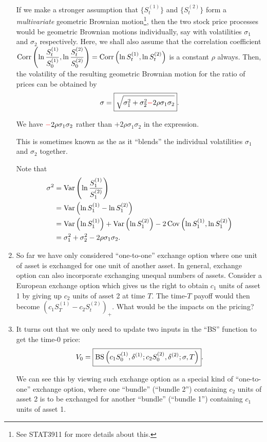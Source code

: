 \begin{enumerate}
If we make a stronger assumption that \(\{S_t^{(1)}\}\) and \(\{S_t^{(2)}\}\)
form a \emph{multivariate} geometric Brownian motion\footnote{See STAT3911 for
more details about this.}, then the two stock price processes would be
geometric Brownian motions individually, say with volatilities \(\sigma_1\) and
\(\sigma_2\) respectively. Here, we shall also assume that the correlation
coefficient \(\displaystyle \operatorname{Corr}\qty(\ln \frac{S_t^{(1)}}{S_0^{(1)}},\ln
\frac{S_t^{(2)}}{S_0^{(2)}})=\operatorname{Corr}\qty(\ln S_t^{(1)},\ln S_t^{(2)})\) is a
constant \(\rho\) always.  Then, the volatility of the resulting geometric
Brownian motion for the ratio of prices can be obtained by
\[
\sigma=\boxed{\sqrt{\sigma_1^{2}+\sigma_2^{2}{\color{red}-}2\rho\sigma_1\sigma_2}}.
\]
\begin{warning}
We have \({\color{red}-}2\rho\sigma_1\sigma_2\) rather than \(+2\rho\sigma_1\sigma_2\)
in the expression.
\end{warning}

This is sometimes known as the  as it ``blends'' the
individual volatilities \(\sigma_1\) and \(\sigma_2\) together.

\begin{pf}
Note that
\begin{align*}
\sigma^2&=\operatorname{Var}\qty(\ln\frac{S_1^{(1)}}{S_1^{(2)}}) \\
&=\operatorname{Var}\qty(\ln S_1^{(1)}-\ln S_1^{(2)}) \\
&=\operatorname{Var}\qty(\ln S_1^{(1)})+\operatorname{Var}\qty(\ln S_1^{(2)})-2\operatorname{Cov}\qty(\ln S_1^{(1)},\ln S_1^{(2)}) \\
&=\sigma_1^2+\sigma_2^2-2\rho\sigma_1\sigma_2.
\end{align*}
\end{pf}

\item So far we have only considered ``one-to-one'' exchange option where one
unit of asset is exchanged for one unit of another asset. In general, exchange
option can also incorporate exchanging unequal numbers of assets. Consider a
European exchange option which gives us the right to obtain \(c_1\) units of
asset 1 by giving up \(c_2\) units of asset 2 at time \(T\). The time-\(T\)
payoff would then become \((c_1S_T^{(1)}-c_2S_t^{(2)})_{+}\). What would be the
impacts on the pricing?

\item \label{it:gen-exchange-opt-fmla} It turns out that we only need to
update two inputs in the ``BS'' function to get the time-0 price:
\[
V_0=\boxed{\operatorname{BS}\qty(c_1S_0^{(1)},\delta^{(1)};c_2S_0^{(2)},\delta^{(2)};\sigma,T)}.
\]
\begin{pf}
We can see this by viewing such exchange option as a special kind of
``one-to-one'' exchange option, where one ``bundle'' 
(``bundle 2'') containing \(c_2\) units of asset 2 is to be exchanged for
another ``bundle'' (``bundle 1'')  containing \(c_1\) units of
asset 1.


\end{pf}
\end{enumerate}
